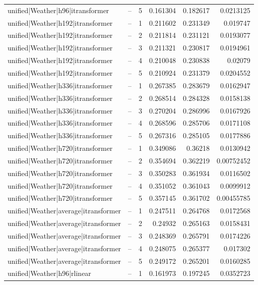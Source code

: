 \begin{longtable}{llrrrr}
unified|Weather|h96|itransformer & -- & 5 & 0.161304 & 0.182617 & 0.0213125 \\
unified|Weather|h192|itransformer & -- & 1 & 0.211602 & 0.231349 & 0.019747 \\
unified|Weather|h192|itransformer & -- & 2 & 0.211814 & 0.231121 & 0.0193077 \\
unified|Weather|h192|itransformer & -- & 3 & 0.211321 & 0.230817 & 0.0194961 \\
unified|Weather|h192|itransformer & -- & 4 & 0.210048 & 0.230838 & 0.02079 \\
unified|Weather|h192|itransformer & -- & 5 & 0.210924 & 0.231379 & 0.0204552 \\
unified|Weather|h336|itransformer & -- & 1 & 0.267385 & 0.283679 & 0.0162947 \\
unified|Weather|h336|itransformer & -- & 2 & 0.268514 & 0.284328 & 0.0158138 \\
unified|Weather|h336|itransformer & -- & 3 & 0.270204 & 0.286996 & 0.0167926 \\
unified|Weather|h336|itransformer & -- & 4 & 0.268596 & 0.285706 & 0.0171108 \\
unified|Weather|h336|itransformer & -- & 5 & 0.267316 & 0.285105 & 0.0177886 \\
unified|Weather|h720|itransformer & -- & 1 & 0.349086 & 0.36218 & 0.0130942 \\
unified|Weather|h720|itransformer & -- & 2 & 0.354694 & 0.362219 & 0.00752452 \\
unified|Weather|h720|itransformer & -- & 3 & 0.350283 & 0.361934 & 0.0116502 \\
unified|Weather|h720|itransformer & -- & 4 & 0.351052 & 0.361043 & 0.0099912 \\
unified|Weather|h720|itransformer & -- & 5 & 0.357145 & 0.361702 & 0.00455785 \\
unified|Weather|average|itransformer & -- & 1 & 0.247511 & 0.264768 & 0.0172568 \\
unified|Weather|average|itransformer & -- & 2 & 0.24932 & 0.265163 & 0.0158431 \\
unified|Weather|average|itransformer & -- & 3 & 0.248369 & 0.265791 & 0.0174226 \\
unified|Weather|average|itransformer & -- & 4 & 0.248075 & 0.265377 & 0.017302 \\
unified|Weather|average|itransformer & -- & 5 & 0.249172 & 0.265201 & 0.0160285 \\
unified|Weather|h96|rlinear & -- & 1 & 0.161973 & 0.197245 & 0.0352723 \\

\end{longtable}
